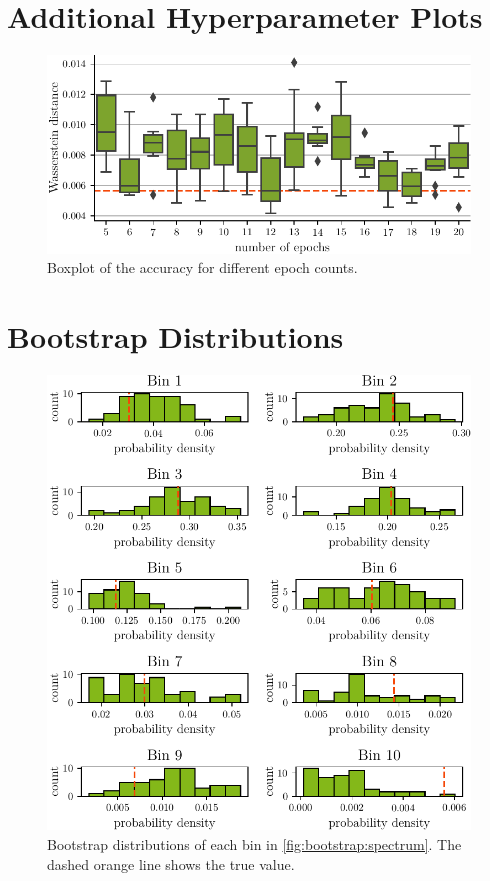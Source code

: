 \section{Additional Hyperparameter Plots}
\begin{figure}
  \centering
  \includegraphics[scale=1]{content/plots/hyperparam/num_epochs_vs_wd_boxplot_lessheight.pdf}
  \caption{Boxplot of the accuracy for different epoch counts.}
  \label{fig:hyperparameter:num_epochs_vs_wd_boxplot}
\end{figure}


\clearpage
\section{Bootstrap Distributions}
\begin{figure}
  \centering
  \includegraphics[scale=1]{content/plots/bootstrap:distributions_doubleheight.pdf}
  \caption{
    Bootstrap distributions of each bin in \autoref{fig:bootstrap:spectrum}.
    The dashed orange line shows the true value.
  }
  \label{fig:bootstrap:distributions}
\end{figure}


